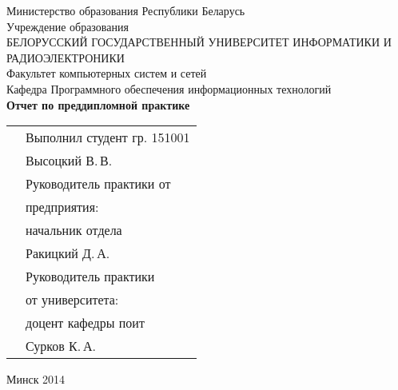 \begin{titlepage}
    
    \begin{center}
        Министерство образования Республики Беларусь \\[0.4cm] 

        Учреждение образования \\

        \MakeUppercase{БЕЛОРУССКИЙ ГОСУДАРСТВЕННЫЙ УНИВЕРСИТЕТ ИНФОРМАТИКИ И РАДИОЭЛЕКТРОНИКИ} \\[0.4cm]

        Факультет компьютерных систем и сетей \\[0.4cm]

        Кафедра Программного обеспечения информационных технологий \\[3.4cm] %

        {\large\bfseries{Отчет по преддипломной практике}} \\[2cm]

        \noindent
        \begin{tabular}{p{}p{}}
            & Выполнил студент гр. 151001 \\
            & Высоцкий В.\,В. \\[1cm]

            & Руководитель практики от \\
            & предприятия: \\
            & начальник отдела \\
            & Ракицкий Д.\,А. \\[1cm]

            & Руководитель практики \\
            & от университета: \\
            & доцент кафедры поит \\
            & Сурков К.\,А. \\
        \end{tabular}

        \vfill

        {\normalsize Минск 2014}
    \end{center}

\end{titlepage}
